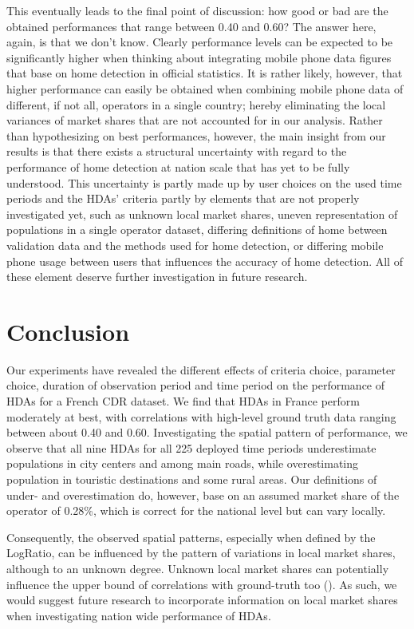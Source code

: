 \documentclass[a4paper]{article}
\begin{document}
This eventually leads to the final point of discussion: how good or bad are the obtained performances that range between 0.40 and 0.60? The answer here, again, is that we don't know. Clearly performance levels can be expected to be significantly higher when thinking about integrating mobile phone data figures that base on home detection in official statistics. It is rather likely, however, that higher performance can easily be obtained when combining  mobile phone data of different, if not all, operators in a single country; hereby eliminating the local variances of market shares that are not accounted for in our analysis. Rather than hypothesizing on best performances, however, the main insight from our results is that there exists a structural uncertainty with regard to the performance of home detection at nation scale that has yet to be fully understood. This uncertainty is partly made up by user choices on the used time periods and the HDAs' criteria partly by elements that are not properly investigated yet, such as unknown local market shares, uneven representation of populations in a single operator dataset, differing definitions of home between validation data and the methods used for home detection, or differing mobile phone usage between users that influences the accuracy of home detection. All of these element deserve further investigation in future research.  


\section{Conclusion}  

Our experiments have revealed the different effects of criteria choice, parameter choice, duration of observation period and time period on the performance of HDAs for a French CDR dataset. We find that HDAs in France perform moderately at best, with correlations with high-level ground truth data ranging between about 0.40 and 0.60. Investigating the spatial pattern of performance, we observe that all nine HDAs for all 225 deployed time periods underestimate populations in city centers and among main roads, while overestimating population in touristic destinations and some rural areas. Our definitions of under- and overestimation do, however, base on an assumed market share of the operator of 0.28\%, which is correct for the national level but can vary locally. 

Consequently, the observed spatial patterns, especially when defined by the LogRatio, can be influenced by the pattern of variations in local market shares, although to an unknown degree. Unknown local market shares can potentially influence the upper bound of correlations with ground-truth too (\cite{Vanhoof_JOS}). As such, we would suggest future research to incorporate information on local market shares when investigating nation wide performance of HDAs. 
\end{document}
